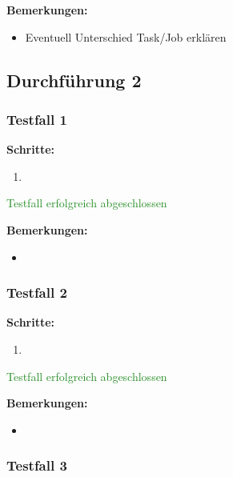 \bigskip
\textbf{Bemerkungen:}

\begin{itemize}[noitemsep,nolistsep]
    \item Eventuell Unterschied Task/Job erklären
\end{itemize}



\subsection*{Durchführung 2}

\xxx

\subsubsection*{Testfall 1}

\textbf{Schritte:}

\begin{enumerate}
    \item 
\end{enumerate}

\textcolor{ForestGreen}{Testfall erfolgreich abgeschlossen}

\bigskip
\textbf{Bemerkungen:}

\begin{itemize}[noitemsep,nolistsep]
    \item 
\end{itemize}


\subsubsection*{Testfall 2}

\textbf{Schritte:}

\begin{enumerate}
    \item 
\end{enumerate}

\textcolor{ForestGreen}{Testfall erfolgreich abgeschlossen}

\bigskip
\textbf{Bemerkungen:}

\begin{itemize}[noitemsep,nolistsep]
    \item 
\end{itemize}


\subsubsection*{Testfall 3}

